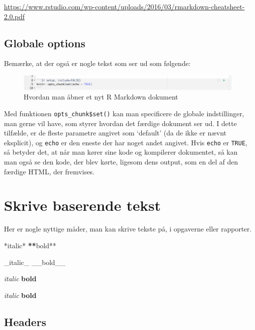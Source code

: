 \documentclass[
]{book}
\newenvironment{Shaded}{\begin{snugshade}}{\end{snugshade}}
\newcommand{\ErrorTok}[1]{\textcolor[rgb]{0.64,0.00,0.00}{\textbf{#1}}}
\newcommand{\NormalTok}[1]{#1}
\newcommand{\SpecialCharTok}[1]{\textcolor[rgb]{0.00,0.00,0.00}{#1}}
\begin{document}
\url{https://www.rstudio.com/wp-content/uploads/2016/03/rmarkdown-cheatsheet-2.0.pdf}

\hypertarget{globale-options}{%
\subsection{Globale options}\label{globale-options}}

Bemærke, at der også er nogle tekst som ser ud som følgende:

\begin{figure}
\centering
\includegraphics{plots/global_options.png}
\caption{Hvordan man åbner et nyt R Markdown dokument}
\end{figure}

Med funktionen \texttt{opts\_chunk\$set()} kan man specificere de globale indstillinger, man gerne vil have, som styrer hvordan det færdige dokument ser ud. I dette tilfælde, er de fleste parametre angivet som `default' (da de ikke er nævnt eksplicit), og \texttt{echo} er den eneste der har noget andet angivet. Hvis \texttt{echo} er \texttt{TRUE}, så betyder det, at når man kører sine kode og kompilerer dokumentet, så kan man også se den kode, der blev kørte, ligesom dens output, som en del af den færdige HTML, der fremvises.

\hypertarget{skrive-baserende-tekst}{%
\section{Skrive baserende tekst}\label{skrive-baserende-tekst}}

Her er nogle nyttige måder, man kan skrive tekste på, i opgaverne eller rapporter.

\begin{Shaded}
\begin{Highlighting}[]
\SpecialCharTok{*}\NormalTok{italic}\SpecialCharTok{*}   \ErrorTok{**}\NormalTok{bold}\SpecialCharTok{**}

\NormalTok{\_italic\_   \_\_bold\_\_}
\end{Highlighting}
\end{Shaded}

\emph{italic} \textbf{bold}

\emph{italic} \textbf{bold}

\hypertarget{headers}{%
\subsection{Headers}\label{headers}}
\end{document}
